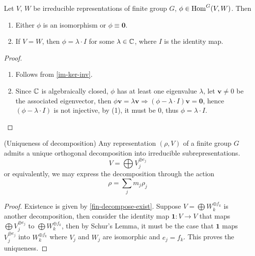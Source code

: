 \begin{lem}
  Let $V$, $W$ be irreducible representations of finite group $G$, $\phi \in \operatorname{Hom}^G(V,W)$.
  Then
  \begin{enumerate}
    \item Either $\phi$ is an isomorphism or $\phi \equiv \bm{0}$.
    \item If $V = W$, then $\phi = \lambda \cdot I$ for some $\lambda \in
      \operatorname{\mathbb{C}}$, where $I$ is the identity map.
  \end{enumerate}
\end{lem}

\begin{proof}\
  \begin{enumerate}
    \item Follows from \ref{im-ker-inv}.
    \item Since $\operatorname{\mathbb{C}}$ is algebraically closed, $\phi$ has at least one
      eigenvalue $\lambda$, let $\bm{v} \neq 0$ be the associated eigenvector, then
      $\phi \bm{v} = \lambda \bm{v} \Rightarrow (\phi - \lambda \cdot I)\bm{v} =
      \bm{0}$, hence $(\phi - \lambda \cdot I)$ is not injective, by (1), it
      must be $0$, thus $\phi = \lambda \cdot I$.
  \end{enumerate}
\end{proof}

\begin{thm}(Uniqueness of decomposition)
  Any representation $(\rho,V)$ of a finite group $G$ admits a unique orthogonal
  decomposition into irreducible subrepresentations.
  \[
    V = \bigoplus V_j^{\oplus e_j}
  \]
  or equivalently, we may express the decomposition through the action
  \[
    \rho = \sum_{j} m_j \rho_j
  \]
\end{thm}

\begin{proof}
  Existence is given by \ref{fin-decompose-exist}.
  Suppose $V = \bigoplus W_k^{\oplus f_k}$ is another decomposition, then
  consider the identity map $\bm{1} : V \to V$ that maps $\bigoplus V_j^{\oplus
    e_j}$ to $\bigoplus W_k^{\oplus f_k}$, then by Schur's Lemma, it must be the
  case that $\bm{1}$ maps $V_j^{\oplus e_j}$ into $W_k^{\oplus f_k}$ where $V_j$
  and $W_j$ are isomorphic and $e_j = f_k$.  This proves the uniqueness.
\end{proof}



